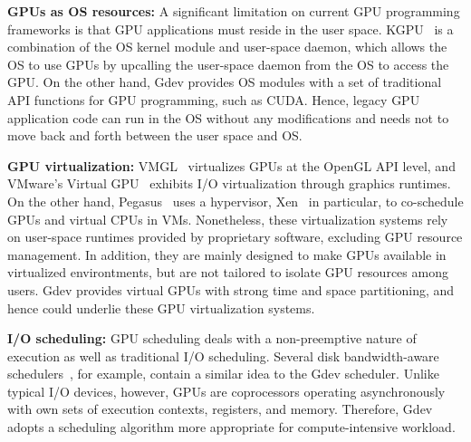 \begin{comment}
Comparisons of Gdev and representatives of the above GPU resource
management approaches are summarized in Table~\ref{tab:related_work}.
\begin{table*}[t]
 \caption{Comparisons of Gdev and prior GPU resource management
 approaches.}
 \label{tab:related_work}
 \begin{center}
  {\sf
  \begin{tabular}{|l|p{12.8cm}|}
   \hline
   \hline
  \end{tabular}
  }
 \end{center}
\vspace{-1em}
\end{table*}
\end{comment}


\textbf{GPUs as OS resources:}
A significant limitation on current GPU programming frameworks is
that GPU applications must reside in the user space.
KGPU~\cite{Sun_SECURITY11_Poster} is a combination of the OS kernel
module and user-space daemon, which allows the OS to use GPUs by
upcalling the user-space daemon from the OS to access the GPU.
On the other hand, Gdev provides OS modules with a set of traditional
API functions for GPU programming, such as CUDA.
Hence, legacy GPU application code can run in the OS without any
modifications and needs not to move back and forth between the user
space and OS.

\textbf{GPU virtualization:}
VMGL~\cite{Lagar-Cavilla_VEE07} virtualizes GPUs at the OpenGL
API level, and VMware's Virtual GPU~\cite{Dowty_SIGOPS09} exhibits I/O
virtualization through graphics runtimes.
On the other hand, Pegasus~\cite{Gupta_ATC11} uses a hypervisor,
Xen~\cite{Barham_SOSP03} in particular, to co-schedule GPUs and virtual
CPUs in VMs.
Nonetheless, these virtualization systems rely on user-space runtimes
provided by proprietary software, excluding GPU resource management.
In addition, they are mainly designed to make GPUs available in
virtualized environtments, but are not tailored to isolate GPU resources
among users.
Gdev provides virtual GPUs with strong time and space partitioning, and
hence could underlie these GPU virtualization systems.

\textbf{I/O scheduling:}
GPU scheduling deals with a non-preemptive nature of execution as well
as traditional I/O scheduling.
Several disk bandwidth-aware schedulers~\cite{Gulati_FAST09,
Povzner_EUROSYS08, Wang_FAST07}, for example, contain a similar idea to
the Gdev scheduler.
Unlike typical I/O devices, however, GPUs are coprocessors operating
asynchronously with own sets of execution contexts, registers, and memory.
Therefore, Gdev adopts a scheduling algorithm more appropriate for
compute-intensive workload.

